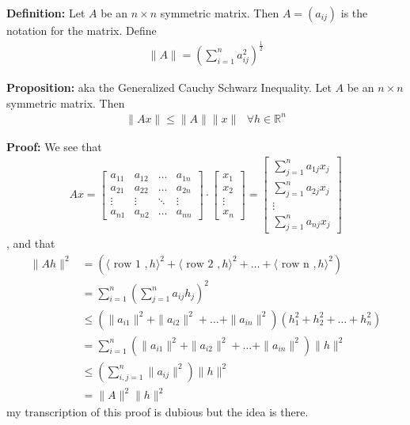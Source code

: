 \documentclass{article}
\newcommand*{\txt}[1]{\text{ #1 }}%
\newcommand*{\iprod}[1]{\langle #1 \rangle}
\newcommand*{\fora}{\txt{}\forall}%
\newcommand*{\rr}{\mathbb{R}}%
\begin{document}
\textbf{Definition:} Let $A$ be an $n\times n$ symmetric matrix. Then $A=(a_{ij})$ is the notation for the matrix. Define \begin{align*}
    \|A\|=(\sum_{i=1}^{n}a_{ij}^2)^{\frac{1}{2}}
\end{align*}

\textbf{Proposition:} aka the Generalized Cauchy Schwarz Inequality. Let $A$ be an $n\times n$ symmetric matrix. Then \begin{align*}
    \|Ax\|\leq \|A\|\|x\|\fora h\in \rr^n
\end{align*}

\textbf{Proof:} We see that \begin{align*}
    Ax=\begin{bmatrix}
        a_{11} & a_{12} & \dots & a_{1n}\\
        a_{21} & a_{22} & \dots & a_{2n}\\
        \vdots & \vdots & \ddots & \vdots\\
        a_{n1} & a_{n2} & \dots & a_{nn}
    \end{bmatrix}\cdot \begin{bmatrix}
        x_1\\
        x_2\\
        \vdots\\
        x_n
    \end{bmatrix}=\begin{bmatrix}
        \sum_{j=1}^{n}a_{1j}x_j\\
        \sum_{j=1}^{n}a_{2j}x_j\\
        \vdots\\
        \sum_{j=1}^{n}a_{nj}x_j
    \end{bmatrix}
\end{align*}, and that \begin{align*}
    \|Ah\|^2&=(\iprod{\txt{row 1},h}^2+\iprod{\txt{row 2},h}^2+\dots+\iprod{\txt{row n},h}^2)\\
    &=\sum_{i=1}^{n}(\sum_{j=1}^{n}a_{ij}h_j)^2\\
    &\leq (\|a_{i1}\|^2+\|a_{i2}\|^2+\dots+\|a_{in}\|^2)(h_1^2+h_2^2+\dots+h_n^2)\\
    &=\sum_{i=1}^{n}(\|a_{i1}\|^2+\|a_{i2}\|^2+\dots+\|a_{in}\|^2)\|h\|^2\\
    &\leq (\sum_{i,j=1}^{n}\|a_{ij}\|^2)\|h\|^2\\
    &=\|A\|^2\|h\|^2
\end{align*} my transcription of this proof is dubious but the idea is there.
\end{document}
